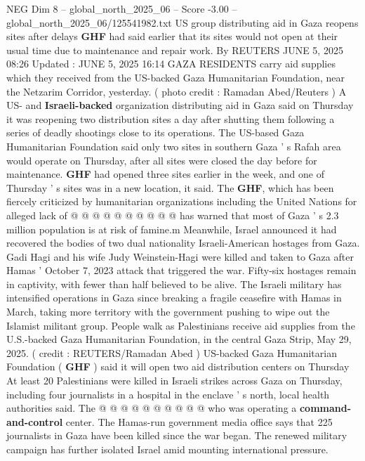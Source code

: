 \begin{textsample}{NEG Dim 8 – global\_north\_2025\_06 – Score -3.00 – global\_north\_2025\_06/125541982.txt}  \label{ex:f8_neg_026}
US group distributing aid in Gaza reopens sites after delays \textbf{GHF} had said earlier that its sites would not open at their usual time due to maintenance and repair work.
By REUTERS JUNE 5, 2025 08:26 Updated : JUNE 5, 2025 16:14 GAZA RESIDENTS carry aid supplies which they received from the US-backed Gaza Humanitarian Foundation, near the Netzarim Corridor, yesterday. ( photo credit : Ramadan Abed/Reuters ) A US- and \textbf{Israeli-backed} organization distributing aid in Gaza said on Thursday it was reopening two distribution sites a day after shutting them following a series of deadly shootings close to its operations.
The US-based Gaza Humanitarian Foundation said only two sites in southern Gaza ' s Rafah area would operate on Thursday, after all sites were closed the day before for maintenance. \textbf{GHF} had opened three sites earlier in the week, and one of Thursday ' s sites was in a new location, it said.
The \textbf{GHF}, which has been fiercely criticized by humanitarian organizations including the United Nations for alleged lack of @ @ @ @ @ @ @ @ @ @ has warned that most of Gaza ' s 2.3 million population is at risk of famine.m Meanwhile, Israel announced it had recovered the bodies of two dual nationality Israeli-American hostages from Gaza.
Gadi Hagi and his wife Judy Weinstein-Hagi were killed and taken to Gaza after Hamas ' October 7, 2023 attack that triggered the war.
Fifty-six hostages remain in captivity, with fewer than half believed to be alive.
The Israeli military has intensified operations in Gaza since breaking a fragile ceasefire with Hamas in March, taking more territory with the government pushing to wipe out the Islamist militant group.
People walk as Palestinians receive aid supplies from the U.S.-backed Gaza Humanitarian Foundation, in the central Gaza Strip, May 29, 2025. ( credit : REUTERS/Ramadan Abed ) US-backed Gaza Humanitarian Foundation ( \textbf{GHF} ) said it will open two aid distribution centers on Thursday At least 20 Palestinians were killed in Israeli strikes across Gaza on Thursday, including four journalists in a hospital in the enclave ' s north, local health authorities said.
The @ @ @ @ @ @ @ @ @ @ who was operating a \textbf{command-and-control} center.
The Hamas-run government media office says that 225 journalists in Gaza have been killed since the war began.
The renewed military campaign has further isolated Israel amid mounting international pressure.

\end{textsample}
